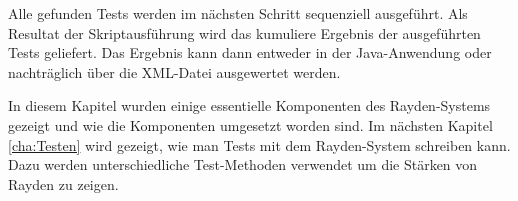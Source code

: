 \SuperPar
Alle gefunden Tests werden im nächsten Schritt sequenziell ausgeführt. Als Resultat der Skriptausführung wird das kumuliere Ergebnis der ausgeführten Tests geliefert. Das Ergebnis kann dann entweder in der Java-Anwendung oder nachträglich über die XML-Datei ausgewertet werden.

\SuperPar
In diesem Kapitel wurden einige essentielle Komponenten des Rayden-Systems gezeigt und wie die Komponenten umgesetzt worden sind. Im nächsten Kapitel \ref{cha:Testen} wird gezeigt, wie man Tests mit dem Rayden-System schreiben kann. Dazu werden unterschiedliche Test-Methoden verwendet um die Stärken von Rayden zu zeigen.
